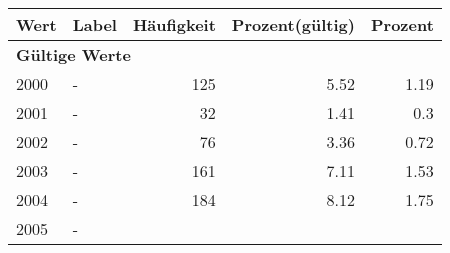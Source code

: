      \begin{longtable}{lXrrr}
     \toprule
     \textbf{Wert} & \textbf{Label} & \textbf{Häufigkeit} & \textbf{Prozent(gültig)} & \textbf{Prozent} \\
     \endhead
     \midrule
     \multicolumn{5}{l}{\textbf{Gültige Werte}}\\

     2000 &
     \multicolumn{1}{X}{ -  } &


       \num{125} &
       \num[round-mode=places,round-precision=2]{5.52} &
         \num[round-mode=places,round-precision=2]{1.19} \\

     2001 &
     \multicolumn{1}{X}{ -  } &


       \num{32} &
       \num[round-mode=places,round-precision=2]{1.41} &
         \num[round-mode=places,round-precision=2]{0.3} \\

     2002 &
     \multicolumn{1}{X}{ -  } &


       \num{76} &
       \num[round-mode=places,round-precision=2]{3.36} &
         \num[round-mode=places,round-precision=2]{0.72} \\

     2003 &
     \multicolumn{1}{X}{ -  } &


       \num{161} &
       \num[round-mode=places,round-precision=2]{7.11} &
         \num[round-mode=places,round-precision=2]{1.53} \\

     2004 &
     \multicolumn{1}{X}{ -  } &


       \num{184} &
       \num[round-mode=places,round-precision=2]{8.12} &
         \num[round-mode=places,round-precision=2]{1.75} \\

     2005 &
     \multicolumn{1}{X}{ -  } &



\end{longtable}
